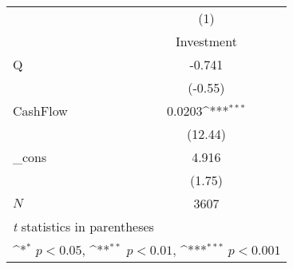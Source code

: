 {
\def\sym#1{\ifmmode^{#1}\else\(^{#1}\)\fi}
\begin{tabular}{l*{1}{c}}
\hline\hline
            &\multicolumn{1}{c}{(1)}\\
            &\multicolumn{1}{c}{Investment}\\
\hline
Q           &      -0.741         \\
            &     (-0.55)         \\
[1em]
CashFlow    &      0.0203\sym{***}\\
            &     (12.44)         \\
[1em]
\_cons      &       4.916         \\
            &      (1.75)         \\
\hline
\(N\)       &        3607         \\
\hline\hline
\multicolumn{2}{l}{\footnotesize \textit{t} statistics in parentheses}\\
\multicolumn{2}{l}{\footnotesize \sym{*} \(p<0.05\), \sym{**} \(p<0.01\), \sym{***} \(p<0.001\)}\\
\end{tabular}
}
